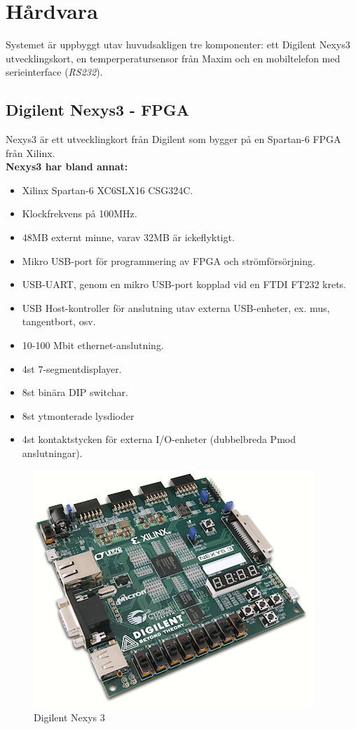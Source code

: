 \section{Hårdvara}\label{sec:hårdvara}
	Systemet är uppbyggt utav huvudsakligen tre komponenter: ett Digilent Nexys3 utvecklingskort, en
	temperperatursensor från Maxim och en mobiltelefon med serieinterface (\emph{RS232}).

	\subsection{Digilent Nexys3 - FPGA}
		Nexys3 är ett utvecklingkort från Digilent som bygger på en Spartan-6 FPGA från Xilinx.
		\\
		\textbf{Nexys3 har bland annat:}
		\begin{itemize}
			\item Xilinx Spartan-6 XC6SLX16 CSG324C.
			\item Klockfrekvens på 100MHz.
			\item 48MB externt minne, varav 32MB är ickeflyktigt.
			\item Mikro USB-port för programmering av FPGA och strömförsörjning.
			\item USB-UART, genom en mikro USB-port kopplad vid en FTDI FT232 krets.
			\item USB Host-kontroller för anslutning utav externa USB-enheter, ex. mus, tangentbort, osv.
			\item 10-100 Mbit ethernet-anslutning.
			\item 4st 7-segmentdisplayer.
			\item 8st binära DIP switchar.
			\item 8st ytmonterade lysdioder
			\item 4st kontaktstycken för externa I/O-enheter (dubbelbreda Pmod anslutningar).
		\end{itemize}
		
\begin{figure}[htp]
	\centering
	\includegraphics[scale=0.8]{nexys3.jpg}
	\caption{Digilent Nexys 3}
\end{figure}
		
